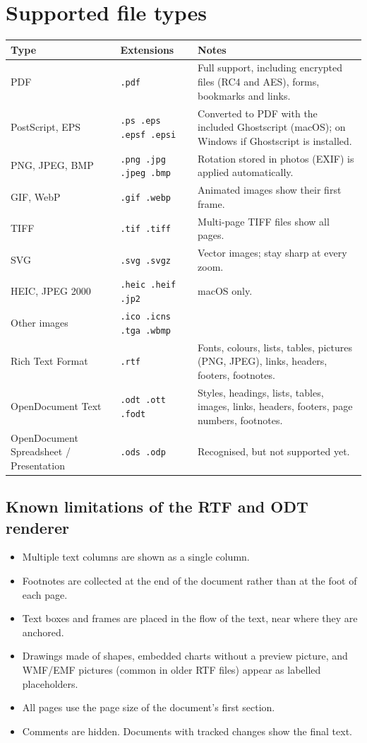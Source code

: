 \documentclass[11pt,a4paper]{article}
\newcommand{\file}[1]{\texttt{#1}}
\begin{document}
\section{Supported file types}\label{sec:formats}

\begin{longtable}{>{\raggedright\arraybackslash}p{3.3cm}>{\raggedright\arraybackslash}p{3.2cm}>{\raggedright\arraybackslash}p{8.2cm}}
\toprule
\textbf{Type} & \textbf{Extensions} & \textbf{Notes} \\
\midrule
\endhead
PDF & \file{.pdf} & Full support, including encrypted files (RC4 and AES), forms, bookmarks and links. \\
PostScript, EPS & \file{.ps .eps .epsf .epsi} & Converted to PDF with the included Ghostscript (macOS); on Windows if Ghostscript is installed. \\
PNG, JPEG, BMP & \file{.png .jpg .jpeg .bmp} & Rotation stored in photos (EXIF) is applied automatically. \\
GIF, WebP & \file{.gif .webp} & Animated images show their first frame. \\
TIFF & \file{.tif .tiff} & Multi-page TIFF files show all pages. \\
SVG & \file{.svg .svgz} & Vector images; stay sharp at every zoom. \\
HEIC, JPEG 2000 & \file{.heic .heif .jp2} & macOS only. \\
Other images & \file{.ico .icns .tga .wbmp} & \\
Rich Text Format & \file{.rtf} & Fonts, colours, lists, tables, pictures (PNG, JPEG), links, headers, footers, footnotes. \\
OpenDocument Text & \file{.odt .ott .fodt} & Styles, headings, lists, tables, images, links, headers, footers, page numbers, footnotes. \\
OpenDocument Spreadsheet / Presentation & \file{.ods .odp} & Recognised, but not supported yet. \\
\bottomrule
\end{longtable}

\subsection{Known limitations of the RTF and ODT renderer}
\begin{itemize}
  \item Multiple text columns are shown as a single column.
  \item Footnotes are collected at the end of the document rather than at the foot of each page.
  \item Text boxes and frames are placed in the flow of the text, near where they are anchored.
  \item Drawings made of shapes, embedded charts without a preview picture, and WMF/EMF pictures
        (common in older RTF files) appear as labelled placeholders.
  \item All pages use the page size of the document's first section.
  \item Comments are hidden. Documents with tracked changes show the final text.
\end{itemize}
\end{document}

